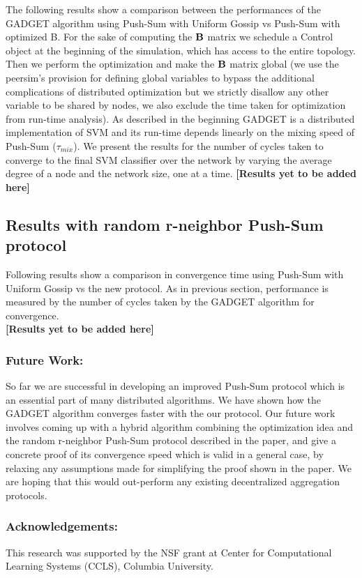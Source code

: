 \documentclass[runningheads,a4paper]{llncs}
\begin{document}
The following results show a comparison between the performances of the GADGET algorithm using Push-Sum with Uniform Gossip vs Push-Sum with optimized B. For the sake of computing the $\bf{B}$ matrix we schedule a Control object at the beginning of the simulation, which has access to the entire topology. Then we perform the optimization and make the $\bf{B}$ matrix global (we use the peersim's provision for defining global variables to bypass the additional complications of distributed optimization but we strictly disallow any other variable to be shared by nodes, we also exclude the time taken for optimization from run-time analysis). As described in the beginning GADGET is a distributed implementation of SVM and its run-time depends linearly on the mixing speed of Push-Sum ($\tau_{mix}$). We present the results for the number of cycles taken to converge to the final SVM classifier over the network by varying the average degree of a node and the network size, one at a time.
\textbf{[Results yet to be added here]}

\subsection{Results with random r-neighbor Push-Sum protocol}

Following results show a comparison in convergence time using Push-Sum with Uniform Gossip vs the new protocol. As in previous section, performance is measured by the number of cycles taken by the GADGET algorithm for convergence. \\
\textbf{[Results yet to be added here]} \\

\subsubsection*{Future Work:}
So far we are successful in developing an improved Push-Sum protocol which is an essential part of many distributed algorithms. We have shown how the GADGET algorithm converges faster with the our protocol. Our future work involves coming up with a hybrid algorithm combining the optimization idea and the random r-neighbor Push-Sum protocol described in the paper, and give a concrete proof of its convergence speed which is valid in a general case, by relaxing any assumptions made for simplifying the proof shown in the paper. We are hoping that this would out-perform any existing decentralized aggregation protocols.

\subsubsection*{Acknowledgements:}
This research was supported by the NSF grant at Center for Computational Learning Systems (CCLS), Columbia University.
\end{document}
